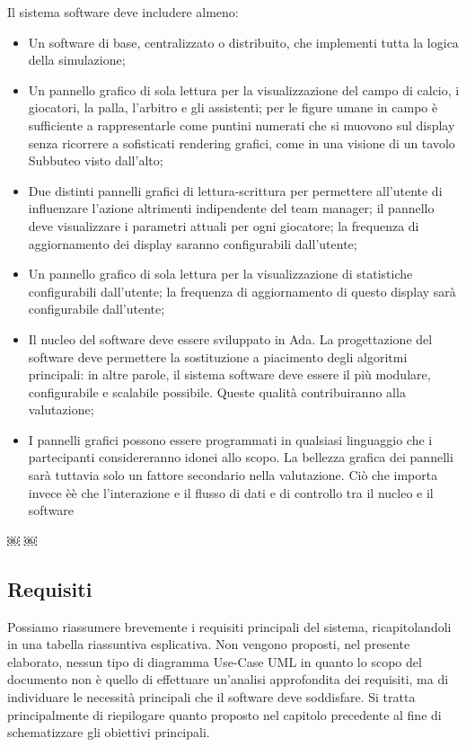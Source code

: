 \documentclass[aps,letterpaper,10pt]{article}
\begin{document}
Il sistema software deve includere almeno:
\begin{itemize}
	\item Un software di base, centralizzato o distribuito, che implementi tutta la logica della simulazione;
	\item Un pannello grafico di sola lettura per la visualizzazione del campo di calcio, i giocatori, la palla, l'arbitro e gli assistenti; per le figure umane in campo \`e sufficiente a rappresentarle come puntini numerati che si muovono sul display senza ricorrere a sofisticati rendering grafici, come in una visione di un tavolo Subbuteo visto dall'alto;
	\item Due distinti pannelli grafici di lettura-scrittura per permettere all'utente di influenzare l'azione altrimenti indipendente del team manager; il pannello deve visualizzare i parametri attuali per ogni giocatore; la frequenza di aggiornamento dei display saranno configurabili dall'utente;
	\item Un pannello grafico di sola lettura per la visualizzazione di statistiche configurabili dall'utente; la frequenza di aggiornamento di questo display sar\`a configurabile dall'utente;
	\item Il nucleo del software deve essere sviluppato in Ada. La progettazione del software deve permettere la sostituzione a piacimento degli algoritmi principali: in altre parole, il sistema software deve essere il pi\`u modulare, configurabile e scalabile possibile. Queste qualit\`a contribuiranno alla valutazione;
	\item I pannelli grafici possono essere programmati in qualsiasi linguaggio che i partecipanti considereranno idonei allo scopo. La bellezza grafica dei pannelli sar\`a tuttavia solo un fattore secondario nella valutazione. Ci\`o che importa invece è\`e che l'interazione e il flusso di dati e di controllo tra il nucleo e il software
\end{itemize}
￼ ￼
\subsection{Requisiti} 

Possiamo riassumere brevemente i requisiti principali del sistema, ricapitolandoli in una tabella riassuntiva esplicativa. Non vengono proposti, nel presente elaborato, nessun tipo di diagramma Use-Case UML in quanto lo scopo del documento non \`e quello di effettuare un'analisi approfondita dei requisiti, ma di individuare le necessit\`a principali che il software deve soddisfare. Si tratta principalmente di riepilogare quanto proposto nel capitolo precedente al fine di schematizzare gli obiettivi principali.
\end{document}
